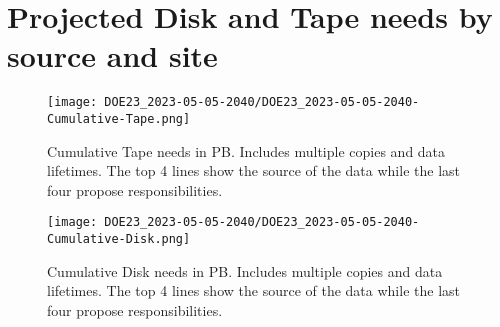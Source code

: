 \section{Projected Disk and Tape needs by source and site}
\begin{figure}[h]
\centering\texttt{[image: DOE23\_2023-05-05-2040/DOE23\_2023-05-05-2040-Cumulative-Tape.png]}
\caption{Cumulative Tape needs in PB. Includes multiple copies and data lifetimes. The top 4 lines show the source of the data while the last four propose responsibilities.}
\label{fig:Cumulative-Tape}
\end{figure}
\begin{figure}[h]
\centering\texttt{[image: DOE23\_2023-05-05-2040/DOE23\_2023-05-05-2040-Cumulative-Disk.png]}
\caption{Cumulative Disk needs in PB. Includes multiple copies and data lifetimes. The top 4 lines show the source of the data while the last four propose responsibilities.}
\label{fig:Cumulative-Disk}
\end{figure}
